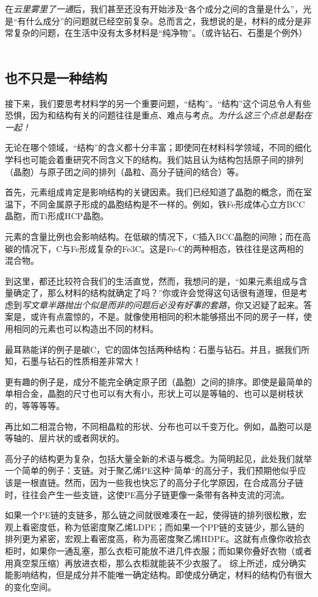 在\textsl{云里雾里了一通}后，我们甚至还没有开始涉及“各个成分之间的含量是什么”，光是“有什么成分”的问题就已经空前复杂。总而言之，我想说的是，材料的成分是非常复杂的问题，在生活中没有太多材料是“纯净物”。（或许钻石、石墨是个例外）
 
\subsection{也不只是一种结构}
接下来，我们要思考材料学的另一个重要问题，“结构”。“结构”这个词总令人有些恐惧，因为和结构有关的问题往往是重点、难点与考点。\textsl{为什么这三个点总是黏在一起！}

无论在哪个领域，“结构”的含义都十分丰富；即使同在材料科学领域，不同的细化学科也可能会着重研究不同含义下的结构。我们姑且认为结构包括原子间的排列（晶胞）与原子团之间的排列（晶粒、高分子链间的结合）等。

首先，元素组成肯定是影响结构的关键因素。我们已经知道了晶胞的概念，而在室温下，不同金属原子形成的晶胞结构是不一样的。例如，铁Fe形成体心立方BCC晶胞，而Ti形成HCP晶胞。

元素的含量比例也会影响结构。在低碳的情况下，C插入BCC晶胞的间隙；而在高碳的情况下，C与Fe形成复杂的Fe3C。这是Fe-C的两种相态，铁往往是这两相的混合物。

到这里，都还比较符合我们的生活直觉，然而，我想问的是，“如果元素组成与含量确定了，那么材料的结构就确定了吗？”你或许会觉得这句话很有道理，但是考虑到\textsl{写文章半路抛出个似是而非的问题后必没有好事的套路}，你又迟疑了起来。答案是，或许有点震惊的，不是。就像使用相同的积木能够搭出不同的房子一样，使用相同的元素也可以构造出不同的材料。

最耳熟能详的例子是碳C，它的固体包括两种结构：石墨与钻石。并且，据我们所知，石墨与钻石的性质相差非常大！

更有趣的例子是，成分不能完全确定原子团（晶胞）之间的排序。即使是最简单的单相合金，晶胞的尺寸也可以有大有小，形状上可以是等轴的、也可以是树枝状的，等等等等。

再比如二相混合物，不同相晶粒的形状、分布也可以千变万化。例如，晶胞可以是等轴的、层片状的或者网状的。

高分子的结构更为复杂，包括大量全新的术语与概念。为简明起见，此处我们就举一个简单的例子：支链。对于聚乙烯PE这种“简单“的高分子，我们预期他似乎应该是一根直链。然而，因为一些我也快忘了的高分子化学原因，在合成高分子链时，往往会产生一些支链，这使PE高分子链更像一条带有各种支流的河流。

如果一个PE链的支链多，那么链之间就很难凑在一起，使得链的排列很松散，宏观上看密度低，称为低密度聚乙烯LDPE；而如果一个PP链的支链少，那么链的排列更为紧密，宏观上看密度高，称为高密度聚乙烯HDPE。这就有点像你收拾衣柜时，如果你一通乱塞，那么衣柜可能放不进几件衣服；而如果你叠好衣物（或者用真空泵压缩）再放进衣柜，那么衣柜就能装不少衣服了。
综上所述，成分确实能影响结构，但是成分并不能唯一确定结构。即使成分确定，材料的结构仍有很大的变化空间。
 
